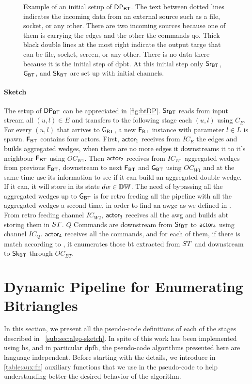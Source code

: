 \begin{figure}[h]
\centering  
{}
\caption[{[\acrshort{iebt}] $\dpbt$ Initial setup}]{Example of an initial setup of $\dpbt$. The text between dotted lines indicates the incoming data from an external source such as a file, socket, or any other. There are two incoming sources because one of them is carrying the edges and the other the commands \acrshort{qo}. Thick black double lines at the most right indicate the output targe that can be file, socket, screen, or any other. There is no data there because it is the initial step of \acrshort{dpbt}. At this initial step only $\mathsf{Sr_{BT}}$, $\mathsf{G_{BT}}$, and $\mathsf{Sk_{BT}}$ are set up with initial channels.}
\label{fig:btDP}
\end{figure}

\paragraph{Sketch} The setup of $\dpbt$ can be appreciated in \autoref{fig:btDP}. $\mathsf{Sr_{BT}}$ reads from input stream all $(u,l) \in E$ and transfers to the following stage each $(u,l)$ using $C_E$.
For every $(u,l)$ that arrives to $\mathsf{G_{BT}}$, a new $\mathsf{F_{BT}}$ instance with parameter $l \in L$ is spawn. $\mathsf{F_{BT}}$ contains four actors. 
First, $\mathsf{actor_1}$ receives from $IC_E$ the edges and builds aggregated wedges, when there are no more edges it downstreams it to it's neighbour $\mathsf{F_{BT}}$ using $OC_{W1}$. 
Then $\mathsf{actor_2}$ receives from $IC_{W1}$ aggregated wedges from previous $\mathsf{F_{BT}}$, downstream to next $\mathsf{F_{BT}}$ and $\mathsf{G_{BT}}$ using $OC_{W1}$ and at the same time use its information to see 
if it can build an aggregated double wedge. If it can, it will store in its state $dw \in \mathbb{DW}$.
The need of bypassing all the aggregated wedges up to $\mathsf{G_{BT}}$ is for retro feeding all the pipeline with all the aggregated wedges a second time, in order to find an \acrfull{awgc} as we defined in .
From retro feeding channel $IC_{W2}$, $\mathsf{actor_3}$ receives all the \acrshort{awg}  and builds \acrshort{abt} storing them in $ST$. 
$Q$ Commands are downstream from $\mathsf{Sr_{BT}}$ to $\mathsf{actor_4}$ using channel $IC_Q$. $\mathsf{actor_4}$ receives all the commands, and for each of them, if there is match according to , it enumerates those \acrshort{bt} extracted from $ST$ and downstream to $\mathsf{Sk_{BT}}$ through $OC_{BT}$.

\section{Dynamic Pipeline for Enumerating Bitriangles}\label{sub:sec:iebt:dpalgo}
In this section, we present all the pseudo-code definitions of each of the stages described in ~\autoref{sub:sec:algo-sketch}. 
In spite of this work has been implemented using \acrshort{hs}, and in particular \acrshort{dpfh}, the pseudo-code algorithms presented here are language independent.
Before starting with the details, we introduce in \autoref{table:aux:fn} auxiliary functions that we use in the pseudo-code to help understanding better the desired behavior of the algorithm.

